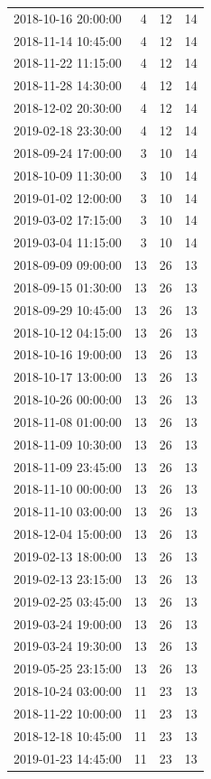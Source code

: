 \begin{tabular}{lrrr}
2018-10-16 20:00:00 & 4 & 12 & 14 \\
2018-11-14 10:45:00 & 4 & 12 & 14 \\
2018-11-22 11:15:00 & 4 & 12 & 14 \\
2018-11-28 14:30:00 & 4 & 12 & 14 \\
2018-12-02 20:30:00 & 4 & 12 & 14 \\
2019-02-18 23:30:00 & 4 & 12 & 14 \\
2018-09-24 17:00:00 & 3 & 10 & 14 \\
2018-10-09 11:30:00 & 3 & 10 & 14 \\
2019-01-02 12:00:00 & 3 & 10 & 14 \\
2019-03-02 17:15:00 & 3 & 10 & 14 \\
2019-03-04 11:15:00 & 3 & 10 & 14 \\
2018-09-09 09:00:00 & 13 & 26 & 13 \\
2018-09-15 01:30:00 & 13 & 26 & 13 \\
2018-09-29 10:45:00 & 13 & 26 & 13 \\
2018-10-12 04:15:00 & 13 & 26 & 13 \\
2018-10-16 19:00:00 & 13 & 26 & 13 \\
2018-10-17 13:00:00 & 13 & 26 & 13 \\
2018-10-26 00:00:00 & 13 & 26 & 13 \\
2018-11-08 01:00:00 & 13 & 26 & 13 \\
2018-11-09 10:30:00 & 13 & 26 & 13 \\
2018-11-09 23:45:00 & 13 & 26 & 13 \\
2018-11-10 00:00:00 & 13 & 26 & 13 \\
2018-11-10 03:00:00 & 13 & 26 & 13 \\
2018-12-04 15:00:00 & 13 & 26 & 13 \\
2019-02-13 18:00:00 & 13 & 26 & 13 \\
2019-02-13 23:15:00 & 13 & 26 & 13 \\
2019-02-25 03:45:00 & 13 & 26 & 13 \\
2019-03-24 19:00:00 & 13 & 26 & 13 \\
2019-03-24 19:30:00 & 13 & 26 & 13 \\
2019-05-25 23:15:00 & 13 & 26 & 13 \\
2018-10-24 03:00:00 & 11 & 23 & 13 \\
2018-11-22 10:00:00 & 11 & 23 & 13 \\
2018-12-18 10:45:00 & 11 & 23 & 13 \\
2019-01-23 14:45:00 & 11 & 23 & 13 \\

\end{tabular}

